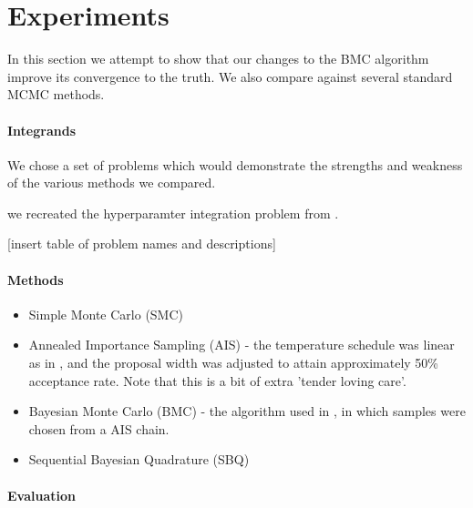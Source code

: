 \documentclass{article}
\begin{document}
\section{Experiments}

In this section we attempt to show that our changes to the BMC algorithm improve its convergence to the truth.  We also compare against several standard MCMC methods.

\paragraph{Integrands}

We chose a set of problems which would demonstrate the strengths and weakness of the various methods we compared.

we recreated the hyperparamter integration problem from \citep{BZMonteCarlo}.

[insert table of problem names and descriptions]

\paragraph{Methods}

\begin{itemize}
\item Simple Monte Carlo (SMC)
\item Annealed Importance Sampling (AIS) - the temperature schedule was linear as in \citep{BZMonteCarlo}, and the proposal width was adjusted to attain approximately 50\% acceptance rate.  Note that this is a bit of extra 'tender loving care'.
\item Bayesian Monte Carlo (BMC) - the algorithm used in \citep{BZMonteCarlo}, in which samples were chosen from a AIS chain.
\item Sequential Bayesian Quadrature (SBQ)
\end{itemize}

\paragraph{Evaluation}
\end{document}
